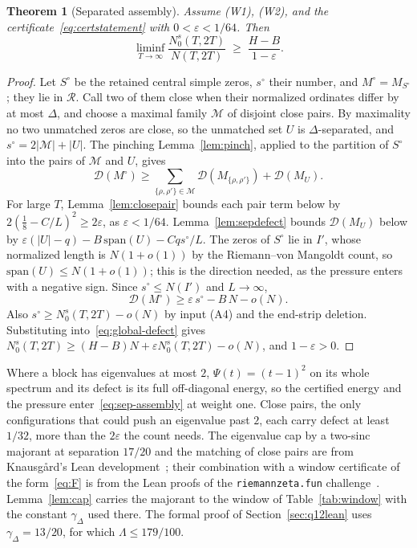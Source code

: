 \documentclass[11pt]{article}
\newtheorem{theorem}{Theorem}[section]
\theoremstyle{definition}
\newcommand{\cR}{\mathcal{R}}
\newcommand{\eps}{\varepsilon}
\begin{document}
\begin{theorem}[Separated assembly]\label{thm:sep-assembly}
Assume (W1), (W2), and the certificate~\eqref{eq:certstatement} with
$0<\eps<1/64$. Then
\begin{equation}\label{eq:sep-assembly}
  \liminf_{T\to\infty}\frac{N_0^s(T,2T)}{N(T,2T)}\;\ge\;\frac{H-B}{1-\eps}.
\end{equation}
\end{theorem}

\begin{proof}
Let $S^\circ$ be the retained central simple zeros, $s^\circ$ their number,
and $M^\circ=M_{S^\circ}$; they lie in $\cR$. Call two of them close when
their normalized ordinates differ by at most $\Delta$, and choose a maximal
family $\mathcal M$ of disjoint close pairs. By maximality no two unmatched
zeros are close, so the unmatched set $U$ is $\Delta$-separated, and
$s^\circ=2|\mathcal M|+|U|$. The pinching Lemma~\ref{lem:pinch}, applied to
the partition of $S^\circ$ into the pairs of $\mathcal M$ and $U$, gives
\[
  \mathcal D(M^\circ)\ge\sum_{\{\rho,\rho'\}\in\mathcal M}\mathcal D(M_{\{\rho,\rho'\}})
  +\mathcal D(M_U).
\]
For large $T$, Lemma~\ref{lem:closepair} bounds each pair term below by
$2(\tfrac18-C/L)^2\ge2\eps$, as $\eps<1/64$. Lemma~\ref{lem:sepdefect} bounds
$\mathcal D(M_U)$ below by $\eps(|U|-q)-B\,\mathrm{span}(U)-Cqs^\circ/L$. The
zeros of $S^\circ$ lie in $I'$, whose normalized length is $N(1+o(1))$ by the
Riemann--von Mangoldt count, so $\mathrm{span}(U)\le N(1+o(1))$; this is the
direction needed, as the pressure enters with a negative sign. Since
$s^\circ\le N(I')$ and $L\to\infty$,
\[
  \mathcal D(M^\circ)\ge\eps\,s^\circ-B\,N-o(N).
\]
Also $s^\circ\ge N_0^s(T,2T)-o(N)$ by input (A4) and the end-strip deletion.
Substituting into~\eqref{eq:global-defect} gives
$N_0^s(T,2T)\ge(H-B)N+\eps N_0^s(T,2T)-o(N)$, and $1-\eps>0$.
\end{proof}

Where a block
has eigenvalues at most $2$, $\Psi(t)=(t-1)^2$ on its whole spectrum and its
defect is its full off-diagonal energy, so the certified energy and the
pressure enter~\eqref{eq:sep-assembly} at weight one. Close pairs, the only
configurations that could push an eigenvalue past $2$, each carry defect at
least $1/32$, more than the $2\eps$ the count needs. The eigenvalue cap by a
two-sinc majorant at separation $17/20$ and the matching of close pairs are
from Knausg\aa rd's Lean development~\cite{Kna26}; their combination with a
window certificate of the form~\eqref{eq:F} is from the Lean proofs of the
\texttt{riemannzeta.fun} challenge~\cite{RZF26}. Lemma~\ref{lem:cap} carries
the majorant to the window of Table~\ref{tab:window} with the constant
$\gamma_\Delta$ used there. The formal proof of Section~\ref{sec:q12lean}
uses $\gamma_\Delta=13/20$, for which $\Lambda\le179/100$.
\end{document}

